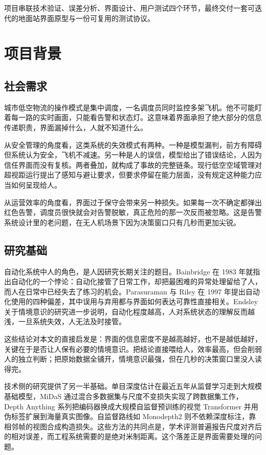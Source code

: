 \documentclass[12pt,a4paper]{ctexart}
\begin{document}
项目串联技术验证、误差分析、界面设计、用户测试四个环节，最终交付一套可迭代的地面站界面原型与一份可复用的测试协议。

\section{项目背景}

\subsection{社会需求}

城市低空物流的操作模式是集中调度，一名调度员同时监控多架飞机。他不可能盯着每一路的实时画面，只能看告警和状态灯。这意味着界面承担了绝大部分的信息传递职责，界面漏掉什么，人就不知道什么。

从安全管理的角度看，这类系统的失效模式有两种。一种是模型漏判，前方有障碍但系统认为安全，飞机不减速。另一种是人的误信，模型给出了错误结论，人因为信任界面而没有复核。两者叠加，就构成了事故的完整链条。现行低空空域管理对超视距运行提出了感知与避让要求，但要求停留在能力层面，没有规定这种能力应当如何呈现给人。

从运营效率的角度看，界面过于保守会带来另一种损失。如果每一次不确定都弹出红色告警，调度员很快就会对告警脱敏，真正危险的那一次反而被忽略。这是告警系统设计里的老问题，在无人机场景下因为决策窗口只有几秒而更加尖锐。

\subsection{研究基础}

自动化系统中人的角色，是人因研究长期关注的题目。Bainbridge 在 1983 年就指出自动化的一个悖论：自动化接管了日常工作，却把最困难的异常处理留给了人，而人在日常中已经失去了练习的机会。Parasuraman 与 Riley 在 1997 年提出自动化使用的四种偏差，其中误用与弃用都与界面如何表达可靠性直接相关。Endsley 关于情境意识的研究进一步说明，自动化程度越高，人对系统状态的理解反而越浅，一旦系统失效，人无法及时接管。

这些结论对本文的直接启发是：界面的信息密度不是越高越好，也不是越低越好，关键在于是否让人保有必要的情境意识。把结论直接喂给人，效率最高，但会削弱人的独立判断；把原始数据全铺开，情境意识最强，但在几秒的决策窗口里没人读得完。

技术侧的研究提供了另一半基础。单目深度估计在最近五年从监督学习走到大规模基础模型，MiDaS 通过混合多数据集与尺度不变损失实现了跨数据集工作，Depth Anything 系列把编码器换成大规模自监督预训练的视觉 Transformer 并用伪标签扩展到海量真实图像。自监督路线如 Monodepth2 则不依赖深度标注，靠相邻帧的视图合成构造损失。这些方法的共同点是，学术评测普遍报告尺度对齐后的相对误差，而工程系统需要的是绝对米制距离。这个落差正是界面需要处理的问题。
\end{document}
